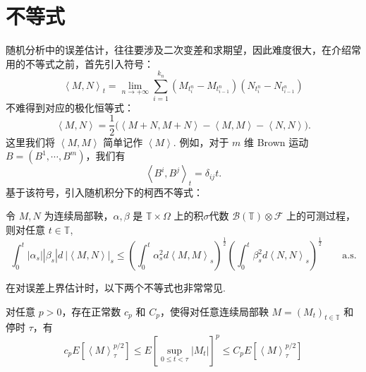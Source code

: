 \section{不等式}
随机分析中的误差估计，往往要涉及二次变差和求期望，因此难度很大，在介绍常用的不等式之前，首先引入符号：
\[
	\left<M, N\right>_{t}=\lim _{n \rightarrow+\infty} \sum_{i=1}^{k_{n}}\left(M_{t_{i}^{n}}-M_{t_{i-1}^{n}}\right)\left(N_{t_{i}^{n}}-N_{t_{i-1}^{n}}\right)
\]
不难得到对应的极化恒等式：
\[
	\left< M,N \right> = \frac12 \bigl( \left< M+N,M+N\right> - \left< M,M\right> -  \left< N,N\right>  \bigl).
\]
这里我们将 $\left<M,M\right>$ 简单记作 $\left<M\right>$. 例如，对于 $m$ 维 Brown 运动 $B = (B^1,\cdots,B^m)$，我们有
\[
	\left< B^i, B^j \right>_t = \delta_{ij} t.
\]
基于该符号，引入随机积分下的柯西不等式：
\begin{proposition}
	令 $M,N$ 为连续局部鞅，$\alpha,\beta$ 是 $\mathbb T\times \Omega$ 上的积$\sigma$代数 $\mathcal B(\mathbb T) \otimes \mathcal F$ 上的可测过程，则对任意 $t\in\mathbb  T$,
	\[
	\int_{0}^{t}\left|\alpha_{s}\right|\left|\beta_{s}\right| d~|\left<M, N\right>|_{s} \leq\left(\int_{0}^{t} \alpha_{s}^{2} d\left<M, M\right>_{s}\right)^{\frac{1}{2}}\left(\int_{0}^{t} \beta_{s}^{2} d\left<N, N\right>_{s}\right)^{\frac{1}{2}} \qquad \mathrm{a.s.}
	\]
\end{proposition}

在对误差上界估计时，以下两个不等式也非常常见. 
\begin{proposition}
	对任意 $p>0$，存在正常数 $c_p$ 和 $C_p$，使得对任意连续局部鞅 $M=(M_t)_{t\in\mathbb T}$ 和停时 $\tau$，有
	\[
	c_{p} E\left[\left<M\right>_{\tau}^{p / 2}\right] \leq E\left[\sup _{0 \leq t < \tau}\left|M_{t}\right|\right]^{p} \leq C_{p} E\left[\left<M\right>_{\tau}^{p / 2}\right]
	\]
\end{proposition}




